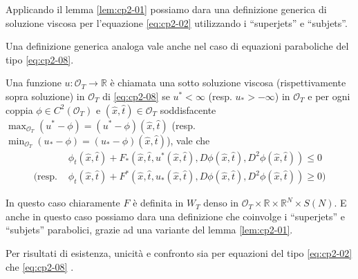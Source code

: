 \begin{osservazione}
Applicando il lemma \ref{lem:cp2-01} possiamo dara una definizione generica di soluzione viscosa per l'equazione \eqref{eq:cp2-02} utilizzando i ``superjets'' e ``subjets''.
\end{osservazione}
Una definizione generica analoga vale anche nel caso di equazioni paraboliche del tipo \eqref{eq:cp2-08}.
\begin{definizione}
Una funzione $u:\mathcal{O}_T\to\mathbb{R}$ è chiamata una sotto soluzione viscosa (rispettivamente sopra soluzione) in $\mathcal{O}_T$ di \eqref{eq:cp2-08} se $u^*<\infty$ (resp. $u_*>-\infty$) in $\mathcal{O}_T$ e per ogni coppia $\phi\in C^2(\mathcal{O}_T)$ e $(\hat{x},\hat{t})\in\mathcal{O}_T$ soddisfacente $\max_{\mathcal{O}_T}(u^*-\phi)=(u^*-\phi)(\hat{x},\hat{t})$ (resp. $\min_{\mathcal{O}_T}(u_*-\phi)=(u_*-\phi)(\hat{x},\hat{t})$), vale che
\[
\begin{aligned}
&\phi_t(\hat{x},\hat{t}) + F_*(\hat{x},\hat{t},u^*(\hat{x},\hat{t}),D\phi(\hat{x},\hat{t}),D^2\phi(\hat{x},\hat{t}))\leq 0 \\
(\text{resp. }&\phi_t(\hat{x},\hat{t})+F^*(\hat{x},\hat{t},u_*(\hat{x},\hat{t}),D\phi(\hat{x},\hat{t}),D^2\phi(\hat{x},\hat{t}))\geq 0)
\end{aligned}
\]
\end{definizione}
\begin{osservazione}
In questo caso chiaramente $F$ è definita in $W_T$ denso in $\mathcal{O}_T\times\mathbb{R}\times\mathbb{R}^N\times S(N)$. E anche in questo caso possiamo dara una definizione che coinvolge i ``superjets'' e ``subjets'' parabolici, grazie ad una variante del lemma \ref{lem:cp2-01}. 
\end{osservazione}
Per risultati di esistenza, unicità e confronto sia per equazioni del tipo \eqref{eq:cp2-02} che \eqref{eq:cp2-08} \cite[vedi][]{crand:lion,giga:main,yun:giga}.
%
%
%
